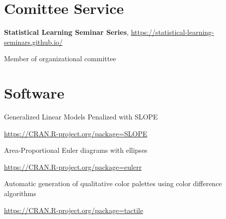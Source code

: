 \documentclass[
  10pt,
  headsepline=true,
  english,
  DIV=12
]{scrartcl}
\renewcommand*{%
  \mkbibnamegiven
}[1]{\ifitemannotation{highlight}{\textbf{#1}}{#1}}
\renewcommand*{%
  \mkbibnamefamily
}[1]{\ifitemannotation{highlight}{\textbf{#1}}{#1}}
\begin{document}
\section{Comittee Service}

\begin{description}[
    labelwidth = \widthof{2020} + 1em,
    leftmargin = \widthof{2020} + 1em,
  ]
  \item[2020]{
              \textbf{Statistical Learning Seminar Series},
              \url{https://statistical-learning-seminars.github.io/}

              Member of organizational committee
        }
\end{description}

\section{Software}

\begin{description}[
    labelwidth = \widthof{qualpalr} + 1em,
    leftmargin = \widthof{qualpalr} + 1em,
  ]
  \item[SLOPE] {
    Generalized Linear Models Penalized with SLOPE

    \url{https://CRAN.R-project.org/package=SLOPE}
    }

  \item[eulerr] {
    Area-Proportional Euler diagrams with ellipses

    \url{https://CRAN.R-project.org/package=eulerr}
    }
  \item[qualpalr] {
    Automatic generation of qualitative color palettes using color
    difference algorithms

    \url{https://CRAN.R-project.org/package=tactile}
    }

\end{description}
\end{document}
